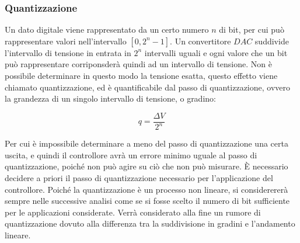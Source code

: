 \documentclass{article}
\numberwithin{equation}{subsection}
\begin{document}
\subsubsection{Quantizzazione}

Un dato digitale viene rappresentato da un certo numero $n$ di bit, per cui può rappresentare valori nell'intervallo $[0,2^n-1]$. Un convertitore $DAC$ suddivide l'intervallo 
di tensione in entrata in $2^n$ intervalli uguali e ogni valore che un bit può rappresentare corriponsderà quindi ad un intervallo di tensione. Non è possibile determinare 
in questo modo la tensione esatta, questo effetto viene chiamato quantizzazione, ed è quantificabile dal passo di quantizzazione, ovvero la grandezza di un singolo intervallo 
di tensione, o gradino:

\begin{equation}
    q=\displaystyle\frac{\Delta V}{2^n}
\end{equation}

\begin{center}
\end{center}
Per cui è impossibile determinare a meno del passo di quantizzazione una certa uscita, e quindi il controllore avrà un errore minimo uguale al passo di quantizzazione, 
poiché non può agire su ciò che non può misurare. \`{E} necessario decidere a priori il passo di quantizzazione necessario per l'applicazione del controllore. 
Poiché la quantizzazione è un processo non lineare, si considerererà sempre nelle successive analisi come se si fosse scelto il numero di bit sufficiente per le applicazioni 
considerate. Verrà considerato alla fine un rumore di quantizzazione dovuto alla differenza tra la suddivisione in gradini e l'andamento lineare. 
\end{document}
